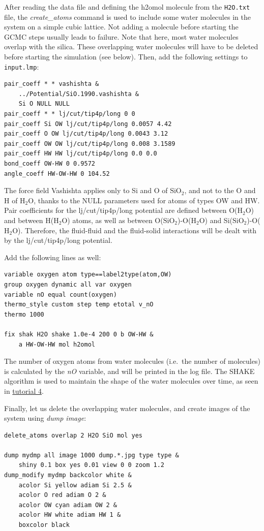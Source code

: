 \documentclass[9pt,tutorial]{livecoms}
\newcommand{\flecmd}[1]{\textcolor{command}{\texttt{#1}}} %
\begin{document}
After reading the data file and defining the h2omol molecule from the \flecmd{H2O.txt}
file, the \textit{create\_atoms} command is used to include some water molecules
in the system on a simple cubic lattice. Not adding a molecule before starting
the GCMC steps usually leads to failure. Note that here, most water molecules
overlap with the silica. These overlapping water molecules will have to be
deleted before starting the simulation (see below). Then, add the following
settings to \flecmd{input.lmp}:
\begin{lstlisting}
pair_coeff * * vashishta &
    ../Potential/SiO.1990.vashishta &
    Si O NULL NULL
pair_coeff * * lj/cut/tip4p/long 0 0
pair_coeff Si OW lj/cut/tip4p/long 0.0057 4.42
pair_coeff O OW lj/cut/tip4p/long 0.0043 3.12
pair_coeff OW OW lj/cut/tip4p/long 0.008 3.1589
pair_coeff HW HW lj/cut/tip4p/long 0.0 0.0
bond_coeff OW-HW 0 0.9572
angle_coeff HW-OW-HW 0 104.52
\end{lstlisting}
The force field Vashishta applies only to Si and O of $\text{SiO}_2$,
and not to the O and H of $\text{H}_2\text{O}$, thanks to the NULL parameters
used for atoms of types OW and HW. Pair coefficients for the lj/cut/tip4p/long
potential are defined between O($\text{H}_2\text{O}$) and between H($\text{H}_2\text{O}$)
atoms, as well as between O($\text{SiO}_2$)-O($\text{H}_2\text{O}$) and
Si($\text{SiO}_2$)-O($\text{H}_2\text{O}$). Therefore, the fluid-fluid and the
fluid-solid interactions will be dealt with by the lj/cut/tip4p/long potential.

Add the following lines as well:
\begin{lstlisting}
variable oxygen atom type==label2type(atom,OW)
group oxygen dynamic all var oxygen
variable nO equal count(oxygen)
thermo_style custom step temp etotal v_nO
thermo 1000

fix shak H2O shake 1.0e-4 200 0 b OW-HW &
    a HW-OW-HW mol h2omol
\end{lstlisting}
The number of oxygen atoms from water molecules (i.e.~the number of molecules)
is calculated by the \textit{nO} variable, and will be printed in the log file.
The SHAKE algorithm is used to maintain the shape of the water molecules over time,
as seen in \hyperref[sheared-confined-label]{tutorial 4}.

Finally, let us delete the overlapping water molecules, and create images
of the system using \textit{dump image}:
\begin{lstlisting}
delete_atoms overlap 2 H2O SiO mol yes

dump mydmp all image 1000 dump.*.jpg type type &
    shiny 0.1 box yes 0.01 view 0 0 zoom 1.2
dump_modify mydmp backcolor white &
    acolor Si yellow adiam Si 2.5 &
    acolor O red adiam O 2 &
    acolor OW cyan adiam OW 2 &
    acolor HW white adiam HW 1 &
    boxcolor black
\end{lstlisting}
\end{document}
